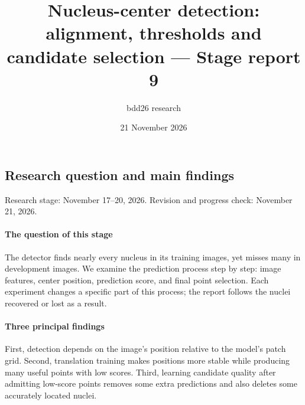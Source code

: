 \documentclass[
  12pt,
]{article}
\title{Nucleus-center detection: alignment, thresholds and candidate selection --- Stage report 9}
\author{bdd26 research}
\date{21 November 2026}
\begin{document}
\maketitle

{
\setcounter{tocdepth}{2}
\tableofcontents
\newpage
}
\subsection{Research question and main findings}

Research stage: November 17–20, 2026. Revision and progress check: November 21, 2026.

\paragraph{The question of this stage}
The detector finds nearly every nucleus in its training images, yet misses many in development images. We examine the prediction process step by step: image features, center position, prediction score, and final point selection. Each experiment changes a specific part of this process; the report follows the nuclei recovered or lost as a result.

\paragraph{Three principal findings}
First, detection depends on the image’s position relative to the model’s patch grid. Second, translation training makes positions more stable while producing many useful points with low scores. Third, learning candidate quality after admitting low-score points removes some extra predictions and also deletes some accurately located nuclei.

\begin{center}\end{center}
\end{document}
